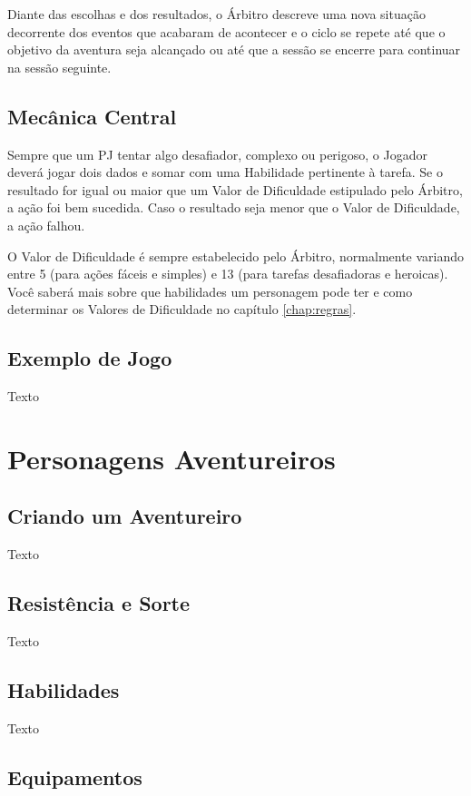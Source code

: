 \documentclass[a4paper, twocolumn, 10pt]{book}
\begin{document}
Diante das escolhas e dos resultados, o Árbitro descreve uma nova situação decorrente dos eventos que acabaram de acontecer e o ciclo se repete até que o objetivo da aventura seja alcançado ou até que a sessão se encerre para continuar na sessão seguinte.

\section{Mecânica Central}

Sempre que um PJ tentar algo desafiador, complexo ou perigoso, o Jogador deverá jogar dois dados e somar com uma Habilidade pertinente à tarefa. Se o resultado for igual ou maior que um Valor de Dificuldade estipulado pelo Árbitro, a ação foi bem sucedida. Caso o resultado seja menor que o Valor de Dificuldade, a ação falhou.

O Valor de Dificuldade é sempre estabelecido pelo Árbitro, normalmente variando entre 5 (para ações fáceis e simples) e 13 (para tarefas desafiadoras e heroicas). Você saberá mais sobre que habilidades um personagem pode ter e como determinar os Valores de Dificuldade no capítulo \ref{chap:regras}.

\section{Exemplo de Jogo}

Texto

\chapter{Personagens Aventureiros}

\section{Criando um Aventureiro}

Texto

\section{Resistência e Sorte}

Texto

\section{Habilidades}

Texto

\section{Equipamentos}
\end{document}
